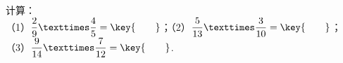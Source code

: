 计算：\\
（1）$\dfrac{2}{9}×\dfrac{4}{5}=\key{\qquad}$；（2）$\dfrac{5}{13}×\dfrac{3}{10}=\key{\qquad}$；
（3）$\dfrac{9}{14}×\dfrac{7}{12}=\key{\qquad}$.